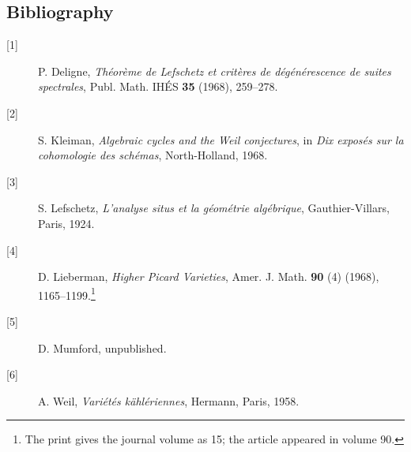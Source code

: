 \subsection*{Bibliography}

\begin{description}
\item[{[1]}] P. Deligne, \emph{Théorème de Lefschetz et critères de
dégénérescence de suites spectrales}, Publ. Math. IHÉS \textbf{35}
(1968), 259--278.

\item[{[2]}] S. Kleiman, \emph{Algebraic cycles and the Weil
conjectures}, in \emph{Dix exposés sur la cohomologie des schémas},
North-Holland, 1968.

\item[{[3]}] S. Lefschetz, \emph{L'analyse situs et la géométrie
algébrique}, Gauthier-Villars, Paris, 1924.

\item[{[4]}] D. Lieberman, \emph{Higher Picard Varieties}, Amer. J.
Math. \textbf{90} (4) (1968), 1165--1199.\footnote{The print gives the
journal volume as 15; the article appeared in volume 90.}

\item[{[5]}] D. Mumford, unpublished.

\item[{[6]}] A. Weil, \emph{Variétés kählériennes}, Hermann, Paris,
1958.
\end{description}

